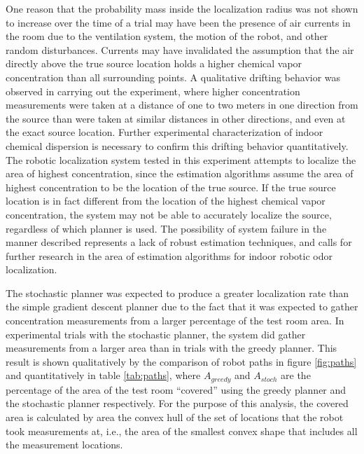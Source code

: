 \documentclass[submit, 12pt]{aiaa-pretty-modified}
\begin{document}
One reason that the probability mass inside the localization
radius was not shown to increase over the time of a trial may have been
the presence of air currents in the room due to the ventilation
system, the motion of the robot, and other random disturbances. Currents may have invalidated the
assumption that the air directly above the true source location
holds a higher chemical vapor concentration than all surrounding
points.  A qualitative drifting behavior was observed in carrying out
the experiment, where higher concentration measurements were taken
at a distance of one to two meters in one direction from the source than were
taken at similar distances in other directions, and even at the exact
source location.  Further experimental characterization of indoor
chemical dispersion is necessary to confirm this drifting
behavior quantitatively.  The robotic localization system tested in
this experiment attempts to localize the area of highest
concentration, since the estimation algorithms assume the area of highest
concentration to be the location of the true source.  If the true
source location is in fact different from the location of the
highest chemical vapor concentration, the system may not be able to accurately
localize the source, regardless of which planner is used.  The
possibility of system failure in the manner described represents a lack of robust estimation techniques, and
calls for further research in the area of estimation algorithms for
indoor robotic odor localization.

The stochastic planner was expected to produce a greater localization
rate than the simple gradient descent planner due to the fact that it
was expected to gather concentration measurements from a larger
percentage of the test room area.  In experimental trials with the
stochastic planner, the system did gather measurements from a larger
area than in trials with the greedy planner.  This result is shown
qualitatively by the comparison of robot paths in figure \ref{fig:paths} and
quantitatively in table \ref{tab:paths}, where $A_{greedy}$ and
$A_{stoch}$ are the percentage of the area of the test room ``covered''
using the greedy planner and the stochastic planner respectively.  For
the purpose of this analysis, the covered area is calculated by area the convex hull
of the set of locations that the robot took measurements at, i.e., the area of
the smallest convex shape that includes all the measurement locations.
\end{document}
